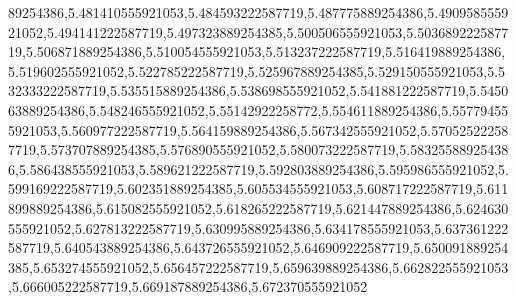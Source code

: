 89254386,5.481410555921053,5.484593222587719,5.487775889254386,5.490958555921052,5.494141222587719,5.497323889254385,5.500506555921053,5.503689222587719,5.506871889254386,5.510054555921053,5.513237222587719,5.516419889254386,5.519602555921052,5.522785222587719,5.525967889254385,5.529150555921053,5.532333222587719,5.535515889254386,5.538698555921052,5.541881222587719,5.545063889254386,5.548246555921052,5.55142922258772,5.554611889254386,5.557794555921053,5.560977222587719,5.564159889254386,5.567342555921052,5.570525222587719,5.573707889254385,5.576890555921052,5.580073222587719,5.583255889254386,5.586438555921053,5.589621222587719,5.592803889254386,5.595986555921052,5.599169222587719,5.602351889254385,5.605534555921053,5.608717222587719,5.611899889254386,5.615082555921052,5.618265222587719,5.621447889254386,5.624630555921052,5.627813222587719,5.630995889254386,5.634178555921053,5.637361222587719,5.640543889254386,5.643726555921052,5.646909222587719,5.650091889254385,5.653274555921052,5.656457222587719,5.659639889254386,5.662822555921053,5.666005222587719,5.669187889254386,5.672370555921052
